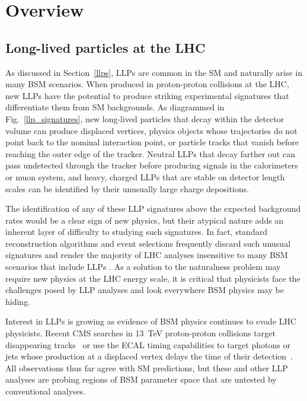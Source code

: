 \section{Overview}
\label{overview}
\subsection{Long-lived particles at the LHC}
As discussed in Section~\ref{llps}, LLPs are common in the SM and naturally arise in many BSM scenarios. When produced in proton-proton collisions at the LHC, new LLPs have the potential to produce striking experimental signatures that differentiate them from SM backgrounds. As diagrammed in Fig.~\ref{llp_signatures}, new long-lived particles that decay within the detector volume can produce displaced vertices, physics objects whose trajectories do not point back to the nominal interaction point, or particle tracks that vanish before reaching the outer edge of the tracker. Neutral LLPs that decay farther out can pass undetected through the tracker before producing signals in the calorimeters or muon system, and heavy, charged LLPs that are stable on detector length scales can be identified by their unusually large charge depositions.



The identification of any of these LLP signatures above the expected background rates would be a clear sign of new physics, but their atypical nature adds an inherent layer of difficulty to studying such signatures. In fact, standard reconstruction algorithms and event selections frequently discard such unusual signatures and render the majority of LHC analyses insensitive to many BSM scenarios that include LLPs \cite{llp_whitepaper}. As a solution to the naturalness problem may require new physics at the LHC energy scale, it is critical that physicists face the challenges posed by LLP analyses and look everywhere BSM physics may be hiding.

Interest in LLPs is growing as evidence of BSM physics continues to evade LHC physicists. Recent CMS searches in \SI{13}{\TeV} proton-proton collisions target disappearing tracks~\cite{disappearing_tracks} or use the ECAL timing capabilities to target photons or jets whose production at a displaced vertex delays the time of their detection~\cite{delayed_photons, delayed_jets}. All observations thus far agree with SM predictions, but these and other LLP analyses are probing regions of BSM parameter space that are untested by conventional analyses.

